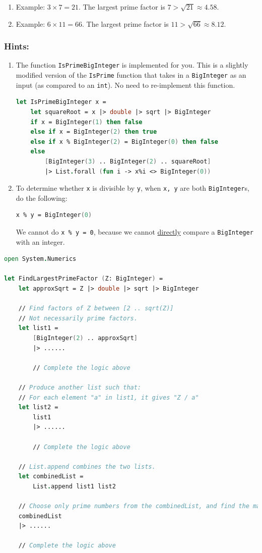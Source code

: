 \documentclass[12pt]{article}
\begin{document}
\begin{enumerate}
\item Example: $3 \times 7 = 21$. The largest prime factor is $7 > \sqrt{21} \approx 4.58$.

\item Example: $6 \times 11 = 66$. The largest prime factor is $11 > \sqrt{66} \approx 8.12$.
\end{enumerate}

\subsubsection*{Hints:}
\begin{enumerate}
\item The function \texttt{IsPrimeBigInteger} is implemented for you. This is a slightly modified version of the \texttt{IsPrime} function that takes in a \texttt{BigInteger} as an input (as compared to an \texttt{int}). No need to re-implement this function.

\begin{lstlisting}[language=FSharp]
let IsPrimeBigInteger x =
    let squareRoot = x |> double |> sqrt |> BigInteger 
    if x = BigInteger(1) then false
    else if x = BigInteger(2) then true
    else if x % BigInteger(2) = BigInteger(0) then false
    else 
        [BigInteger(3) .. BigInteger(2) .. squareRoot]
        |> List.forall (fun i -> x%i <> BigInteger(0))
\end{lstlisting}
\item To determine whether \texttt{x} is divisible by \texttt{y}, when \texttt{x, y} are both \texttt{BigInteger}s, do the following:
\begin{lstlisting}[language=FSharp]
x % y = BigInteger(0)
\end{lstlisting}
We cannot do \texttt{x \% y = 0}, because we cannot \underline{directly} compare a \texttt{BigInteger} with an integer.
\end{enumerate}
\begin{lstlisting}[language=FSharp]
open System.Numerics

let FindLargestPrimeFactor (Z: BigInteger) =
    let approxSqrt = Z |> double |> sqrt |> BigInteger

    // Find factors of Z between [2 .. sqrt(Z)]
    // Not necessarily prime factors.
    let list1 =
        [BigInteger(2) .. approxSqrt]
        |> ......

        // Complete the logic above

    // Produce another list such that:
    // For each element "a" in list1, it gives "Z / a"
    let list2 =
        list1
        |> ......

        // Complete the logic above

    // List.append combines the two lists.
    let combinedList =
        List.append list1 list2

    // Choose only prime numbers from the combinedList, and find the maximum using List.max
    combinedList
    |> ......

    // Complete the logic above
\end{lstlisting}
\end{document}
